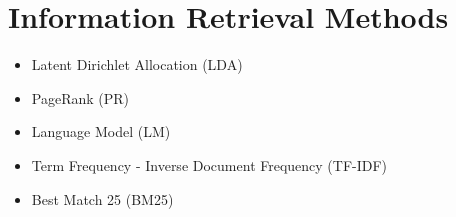 
\section{Information Retrieval Methods}


\begin{frame}{\insertsection}
	\begin{itemize}
		\item Latent Dirichlet Allocation (LDA)
		\item PageRank (PR)
		\item Language Model (LM)
		\item Term Frequency - Inverse Document Frequency (TF-IDF)
		\item Best Match 25 (BM25)
	\end{itemize}
\end{frame}

